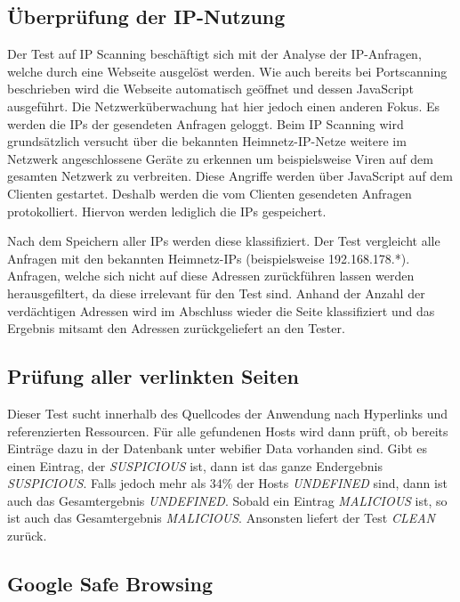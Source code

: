 \subsection{Überprüfung der IP-Nutzung}
Der Test auf IP Scanning beschäftigt sich mit der Analyse der IP-Anfragen, welche durch eine Webseite ausgelöst werden. Wie auch bereits bei Portscanning beschrieben wird die Webseite automatisch geöffnet und dessen JavaScript ausgeführt. Die Netzwerküberwachung hat hier jedoch einen anderen Fokus. Es werden die IPs der gesendeten Anfragen geloggt. Beim IP Scanning wird grundsätzlich versucht über die bekannten Heimnetz-IP-Netze weitere im Netzwerk angeschlossene Geräte zu erkennen um beispielsweise Viren auf dem gesamten Netzwerk zu verbreiten. Diese Angriffe werden über JavaScript auf dem Clienten gestartet. Deshalb werden die vom Clienten gesendeten Anfragen protokolliert. Hiervon werden lediglich die IPs gespeichert.

Nach dem Speichern aller IPs werden diese klassifiziert. Der Test vergleicht alle Anfragen mit den bekannten Heimnetz-IPs (beispielsweise 192.168.178.*). Anfragen, welche sich nicht auf diese Adressen zurückführen lassen werden herausgefiltert, da diese irrelevant für den Test sind. Anhand der Anzahl der verdächtigen Adressen wird im Abschluss wieder die Seite klassifiziert und das Ergebnis mitsamt den Adressen zurückgeliefert an den Tester.

\subsection{Prüfung aller verlinkten Seiten}
\label{sec:konzept-linkchecker}

Dieser Test sucht innerhalb des Quellcodes der Anwendung nach Hyperlinks und referenzierten Ressourcen.
Für alle gefundenen Hosts wird dann prüft, ob bereits Einträge dazu in der Datenbank unter webifier Data vorhanden sind.
Gibt es einen Eintrag, der \textit{SUSPICIOUS} ist, dann ist das ganze Endergebnis \textit{SUSPICIOUS}.
Falls jedoch mehr als 34\% der Hosts \textit{UNDEFINED} sind, dann ist auch das Gesamtergebnis \textit{UNDEFINED}.
Sobald ein Eintrag \textit{MALICIOUS} ist, so ist auch das Gesamtergebnis \textit{MALICIOUS}.
Ansonsten liefert der Test \textit{CLEAN} zurück.

\subsection{Google Safe Browsing}

